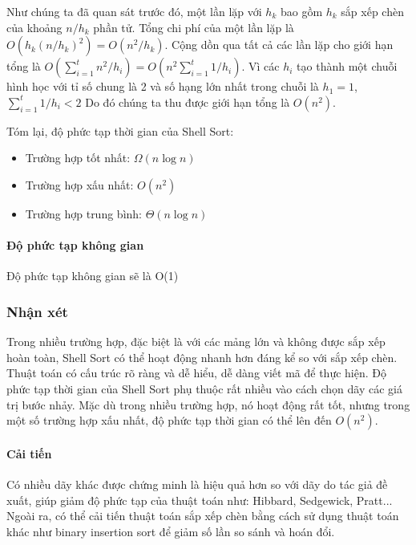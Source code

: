  Như chúng ta đã quan sát trước đó, một lần lặp với $h_k$ bao gồm $h_k$ sắp xếp chèn của khoảng $n/h_k$ phần tử. Tổng chi phí của một lần lặp là $O(h_k(n/h_k)^2)=O(n^2/h_k).$ Cộng dồn qua tất cả các lần lặp cho giới hạn tổng là $O(\sum_{i=1}^{t}n^2/h_i)=O(n^2\sum_{i=1}^{t}1/h_i).$ Vì các $h_i$ tạo thành một chuỗi hình học với tỉ số chung là 2 và số hạng lớn nhất trong chuỗi là $h_1=1$, $\sum_{i=1}^{t}1/h_i<2$ Do đó chúng ta thu được giới hạn tổng là $O(n^2)$.

Tóm lại, độ phức tạp thời gian của Shell Sort: 
 \begin{itemize}
    \item Trường hợp tốt nhất: $\Omega(n\log{n})$ 
    \item Trường hợp xấu nhất: $O(n^2)$
    \item Trường hợp trung bình: $\Theta(n\log{n})$
\end{itemize}

\paragraph{Độ phức tạp không gian}
Độ phức tạp không gian sẽ là O(1)


\subsubsection{Nhận xét}
Trong nhiều trường hợp, đặc biệt là với các mảng lớn và không được sắp xếp hoàn toàn, Shell Sort có thể hoạt động nhanh hơn đáng kể so với sắp xếp chèn. Thuật toán có cấu trúc rõ ràng và dễ hiểu, dễ dàng viết mã để thực hiện. 
Độ phức tạp thời gian của Shell Sort phụ thuộc rất nhiều vào cách chọn dãy các giá trị bước nhảy. Mặc dù trong nhiều trường hợp, nó hoạt động rất tốt, nhưng trong một số trường hợp xấu nhất, độ phức tạp thời gian có thể lên đến $O(n^2)$.



\paragraph{Cải tiến}


Có nhiều dãy khác được chứng minh là hiệu quả hơn so với dãy do tác giả đề xuất, giúp giảm độ phức tạp của thuật toán như: Hibbard, Sedgewick, Pratt... Ngoài ra, có thể cải tiến thuật toán sắp xếp chèn bằng cách sử dụng thuật toán khác như binary insertion sort để giảm số lần so sánh và hoán đổi.

